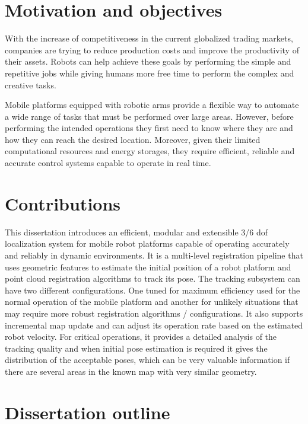 \section{Motivation and objectives}\label{sec:introduction_goals}

With the increase of competitiveness in the current globalized trading markets, companies are trying to reduce production costs and improve the productivity of their assets. Robots can help achieve these goals by performing the simple and repetitive jobs while giving humans more free time to perform the complex and creative tasks.

Mobile platforms equipped with robotic arms provide a flexible way to automate a wide range of tasks that must be performed over large areas. However, before performing the intended operations they first need to know where they are and how they can reach the desired location. Moreover, given their limited computational resources and energy storages, they require efficient, reliable and accurate control systems capable to operate in real time.



\section{Contributions}\label{sec:introduction_contributions}

This dissertation introduces an efficient, modular and extensible 3/6 \gls{dof} localization system for mobile robot platforms capable of operating accurately and reliably in dynamic environments. It is a multi-level registration pipeline that uses geometric features to estimate the initial position of a robot platform and point cloud registration algorithms to track its pose. The tracking subsystem can have two different configurations. One tuned for maximum efficiency used for the normal operation of the mobile platform and another for unlikely situations that may require more robust registration algorithms / configurations. It also supports incremental map update and can adjust its operation rate based on the estimated robot velocity. For critical operations, it provides a detailed analysis of the tracking quality and when initial pose estimation is required it gives the distribution of the acceptable poses, which can be very valuable information if there are several areas in the known map with very similar geometry.



\section{Dissertation outline}\label{sec:introduction_structure}

